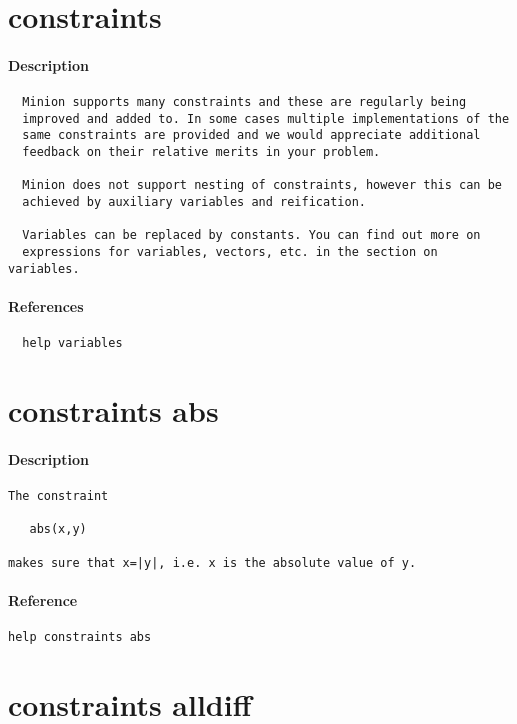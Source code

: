 \section{constraints}
\paragraph{Description}
{\footnotesize
\begin{verbatim}
  Minion supports many constraints and these are regularly being
  improved and added to. In some cases multiple implementations of the
  same constraints are provided and we would appreciate additional
  feedback on their relative merits in your problem.

  Minion does not support nesting of constraints, however this can be
  achieved by auxiliary variables and reification.

  Variables can be replaced by constants. You can find out more on
  expressions for variables, vectors, etc. in the section on variables.
\end{verbatim}
}
\paragraph{References}
{\footnotesize
\begin{verbatim}
  help variables
\end{verbatim}
}
\section{constraints abs}
\paragraph{Description}
{\footnotesize
\begin{verbatim}
The constraint

   abs(x,y)

makes sure that x=|y|, i.e. x is the absolute value of y.
\end{verbatim}
}
\paragraph{Reference}
{\footnotesize
\begin{verbatim}
help constraints abs
\end{verbatim}
}
\section{constraints alldiff}
